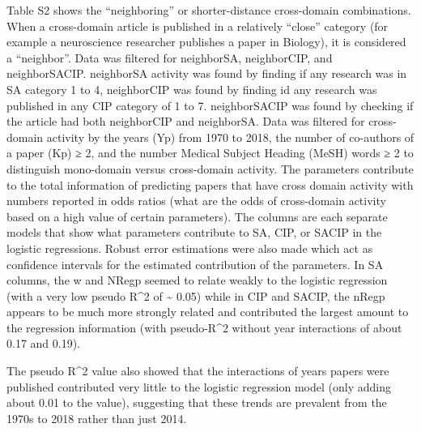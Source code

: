 \documentclass[
]{article}
\begin{document}
Table S2 shows the ``neighboring'' or shorter-distance cross-domain
combinations. When a cross-domain article is published in a relatively
``close'' category (for example a neuroscience researcher publishes a
paper in Biology), it is considered a ``neighbor''. Data was filtered
for neighborSA, neighborCIP, and neighborSACIP. neighborSA activity was
found by finding if any research was in SA category 1 to 4, neighborCIP
was found by finding id any research was published in any CIP category
of 1 to 7. neighborSACIP was found by checking if the article had both
neighborCIP and neighborSA. Data was filtered for cross-domain activity
by the years (Yp) from 1970 to 2018, the number of co-authors of a paper
(Kp) ≥ 2, and the number Medical Subject Heading (MeSH) words ≥ 2 to
distinguish mono-domain versus cross-domain activity. The parameters
contribute to the total information of predicting papers that have cross
domain activity with numbers reported in odds ratios (what are the odds
of cross-domain activity based on a high value of certain parameters).
The columns are each separate models that show what parameters
contribute to SA, CIP, or SACIP in the logistic regressions. Robust
error estimations were also made which act as confidence intervals for
the estimated contribution of the parameters. In SA columns, the w and
NRegp seemed to relate weakly to the logistic regression (with a very
low pseudo R\^{}2 of \textasciitilde{} 0.05) while in CIP and SACIP, the
nRegp appears to be much more strongly related and contributed the
largest amount to the regression information (with pseudo-R\^{}2 without
year interactions of about 0.17 and 0.19).

The pseudo R\^{}2 value also showed that the interactions of years
papers were published contributed very little to the logistic regression
model (only adding about 0.01 to the value), suggesting that these
trends are prevalent from the 1970s to 2018 rather than just 2014.
\end{document}
